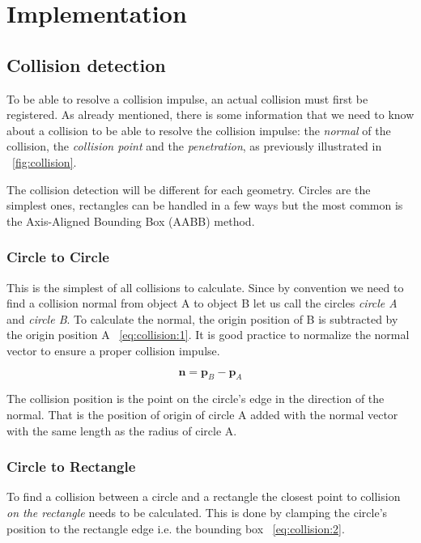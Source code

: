 \documentclass[a4paper,12pt]{report}
\begin{document}
\chapter{Implementation}

\section{Collision detection}

To be able to resolve a collision impulse, an actual collision must first be registered. As already mentioned, there is some information that we need to know about a collision to be able to resolve the collision impulse: the \emph{normal} of the collision, the \emph{collision point} and the \emph{penetration}, as previously illustrated in ~\ref{fig:collision}.

The collision detection will be different for each geometry. Circles are the simplest ones, rectangles can be handled in a few ways but the most common is the Axis-Aligned Bounding Box (AABB) method.

\subsection{Circle to Circle}

This is the simplest of all collisions to calculate. Since by convention we need to find a collision normal from object A to object B let us call the circles \emph{circle A} and \emph{circle B}. To calculate the normal, the origin position of B is subtracted by the origin position A ~\eqref{eq:collision:1}. It is good practice to normalize the normal vector to ensure a proper collision impulse.

\begin{equation}
\mathbf n=\mathbf p_{B}-\mathbf p_{A}
\label{eq:collision:1}
\end{equation}

The collision position is the point on the circle's edge in the direction of the normal. That is the position of origin of circle A added with the normal vector with the same length as the radius of circle A.

\subsection{Circle to Rectangle}

To find a collision between a circle and a rectangle the closest point to collision \emph{on the rectangle} needs to be calculated. This is done by clamping the circle's position to the rectangle edge i.e. the bounding box ~\eqref{eq:collision:2}.
\end{document}
